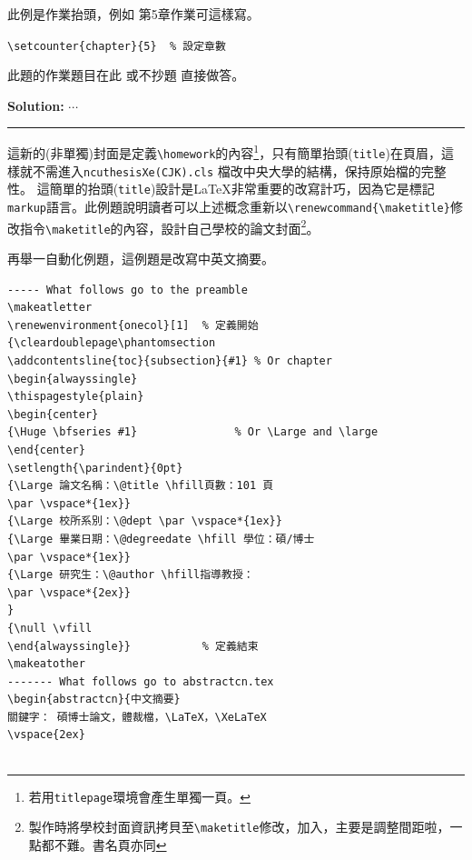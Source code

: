 \begin{appendB}
此例是作業抬頭，例如 第5章作業可這樣寫。

\verb|\setcounter{chapter}{5}  % 設定章數|
\setcounter{chapter}{5}
\begin{pr}
此題的作業題目在此 或不抄題 直接做答。

{\bf Solution:}
$\cdots$
\end{pr}

\rule{\linewidth}{0.5mm} 

這新的(非單獨)封面是定義\verb|\homework|的內容\footnote{若用{\tt titlepage}環境會產生單獨一頁。}，只有簡單抬頭({\tt title})在頁眉，這樣就不需進入{\tt ncuthesisXe(CJK).cls}
檔改中央大學的結構，保持原始檔的完整性。
這簡單的抬頭({\tt title})設計是\LaTeX 非常重要的改寫計巧，因為它是標記{\tt markup}語言。此例題說明讀者可以上述概念重新以\verb|\renewcommand{\maketitle}|修改指令\verb|\maketitle|的內容，設計自己學校的論文封面\footnote{製作時將學校封面資訊拷貝至{\tt \textbackslash maketitle}修改，加入，主要是調整間距啦，一點都不難。書名頁亦同}。\par


再舉一自動化例題，這例題是改寫中英文摘要。

\begin{Verbatim}[frame=single,firstline=1,lastline=50,rulecolor=\color{red},label=New abstract]
----- What follows go to the preamble
\makeatletter
\renewenvironment{onecol}[1]  % 定義開始
{\cleardoublepage\phantomsection
\addcontentsline{toc}{subsection}{#1} % Or chapter
\begin{alwayssingle}
\thispagestyle{plain}
\begin{center}
{\Huge \bfseries #1}               % Or \Large and \large
\end{center}
\setlength{\parindent}{0pt}
{\Large 論文名稱：\@title \hfill頁數：101 頁
\par \vspace*{1ex}}
{\Large 校所系別：\@dept \par \vspace*{1ex}}
{\Large 畢業日期：\@degreedate \hfill 學位：碩/博士 
\par \vspace*{1ex}}
{\Large 研究生：\@author \hfill指導教授：
\par \vspace*{2ex}}
}
{\null \vfill
\end{alwayssingle}}           % 定義結束
\makeatother
------- What follows go to abstractcn.tex
\begin{abstractcn}{中文摘要}
關鍵字： 碩博士論文，體裁檔，\LaTeX，\XeLaTeX
\vspace{2ex}


\end{Verbatim}
\end{appendB}
